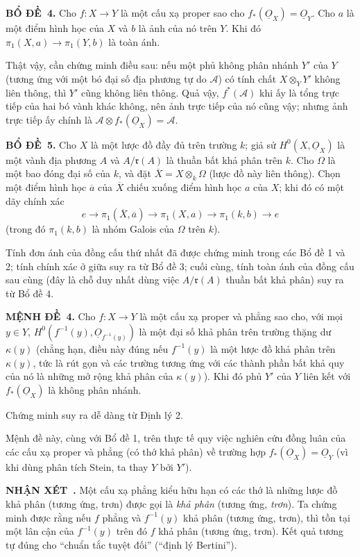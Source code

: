 \documentclass[11pt,twoside,openany]{book}
\numberwithin{equation}{section}
\newcommand{\src}[1]{%
  \phantomsection\hypertarget{src:\fgasourceid:#1}{}%
  \marginpar{\raggedleft\footnotesize\sffamily #1}%
}
\newcommand{\fgasourceid}{unset}
\newcommand{\Osh}{\underline{O}}
\newcommand{\result}[2]{\par\medskip\noindent\textbf{#1\if\relax\detokenize{#2}\relax\else\ #2\fi.}\quad}
\begin{document}
\src{212}
\result{BỔ ĐỀ}{4} Cho $f:X\longrightarrow Y$ là một cấu xạ proper sao cho
$f_*(\Osh_X)=\Osh_Y$. Cho $a$ là một điểm hình học của $X$ và $b$ là ảnh của
nó trên $Y$. Khi đó $\pi_1(X,a)\longrightarrow\pi_1(Y,b)$ là toàn ánh.

Thật vậy, cần chứng minh điều sau: nếu một phủ không phân nhánh $Y'$ của $Y$
(tương ứng với một bó đại số địa phương tự do $\mathcal A$) có tính chất
$X\otimes_Y Y'$ không liên thông, thì $Y'$ cũng không liên thông. Quả vậy,
$f^*(\mathcal A)$ khi ấy là tổng trực tiếp của hai bó vành khác không, nên ảnh
trực tiếp của nó cũng vậy; nhưng ảnh trực tiếp ấy chính là
$\mathcal A\otimes f_*(\Osh_X)=\mathcal A$.

\result{BỔ ĐỀ}{5} Cho $X$ là một lược đồ đầy đủ trên trường $k$; giả sử
$H^0(X,\Osh_X)$ là một vành địa phương $A$ và $A/\mathfrak r(A)$ là thuần bất
khả phân trên $k$. Cho $\Omega$ là một bao đóng đại số của $k$, và đặt
$\overline X=X\otimes_k\Omega$ (lược đồ này liên thông). Chọn một điểm hình
học $\overline a$ của $\overline X$ chiếu xuống điểm hình học $a$ của $X$;
khi đó có một dãy chính xác
\[
  e\longrightarrow\pi_1(\overline X,\overline a)
  \longrightarrow\pi_1(X,a)
  \longrightarrow\pi_1(k,b)\longrightarrow e
\]
(trong đó $\pi_1(k,b)$ là nhóm Galois của $\Omega$ trên $k$).

Tính đơn ánh của đồng cấu thứ nhất đã được chứng minh trong các Bổ đề 1 và 2;
tính chính xác ở giữa suy ra từ Bổ đề 3; cuối cùng, tính toàn ánh của đồng cấu
sau cùng (đây là chỗ duy nhất dùng việc $A/\mathfrak r(A)$ thuần bất khả phân)
suy ra từ Bổ đề 4.

\result{MỆNH ĐỀ}{4} Cho $f:X\longrightarrow Y$ là một cấu xạ proper và phẳng
sao cho, với mọi $y\in Y$, $H^0(f^{-1}(y),\Osh_{f^{-1}(y)})$ là một đại số khả
phân trên trường thặng dư $\kappa(y)$ (chẳng hạn, điều này đúng nếu
$f^{-1}(y)$ là một lược đồ khả phân trên $\kappa(y)$, tức là rút gọn và các
trường tương ứng với các thành phần bất khả quy của nó là những mở rộng khả
phân của $\kappa(y)$). Khi đó phủ $Y'$ của $Y$ liên kết với
$f_*(\Osh_X)$ là không phân nhánh.

Chứng minh suy ra dễ dàng từ Định lý 2.

\src{213}
Mệnh đề này, cùng với Bổ đề 1, trên thực tế quy việc nghiên cứu đồng luân của
các cấu xạ proper và phẳng (có thớ khả phân) về trường hợp
$f_*(\Osh_X)=\Osh_Y$ (vì khi dùng phân tích Stein, ta thay $Y$ bởi $Y'$).

\result{NHẬN XÉT}{} Một cấu xạ phẳng kiểu hữu hạn có các thớ là những lược đồ
khả phân (tương ứng, trơn) được gọi là \emph{khả phân} (tương ứng,
\emph{trơn}). Ta chứng minh được rằng nếu $f$ phẳng và $f^{-1}(y)$ khả phân
(tương ứng, trơn), thì tồn tại một lân cận của $f^{-1}(y)$ trên đó $f$ khả
phân (tương ứng, trơn). Kết quả tương tự đúng cho “chuẩn tắc tuyệt đối”
(“định lý Bertini”).
\end{document}
